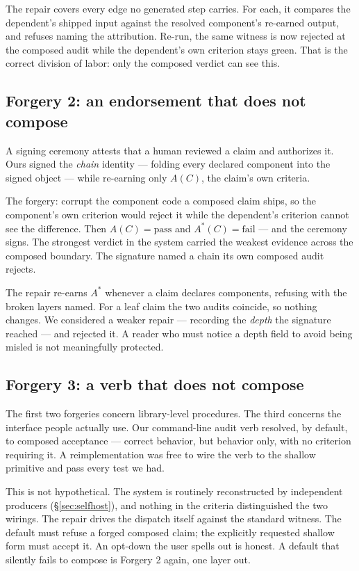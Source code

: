 \documentclass[10pt,twocolumn,letterpaper]{article}
\begin{document}
The repair covers every edge no generated step carries. For each, it compares the dependent's shipped input against the resolved component's re-earned output, and refuses naming the attribution. Re-run, the same witness is now rejected at the composed audit while the dependent's own criterion stays green. That is the correct division of labor: only the composed verdict can see this.

\subsection{Forgery 2: an endorsement that does not compose}
A signing ceremony attests that a human reviewed a claim and authorizes it. Ours signed the \emph{chain} identity --- folding every declared component into the signed object --- while re-earning only $A(C)$, the claim's own criteria.

The forgery: corrupt the component code a composed claim ships, so the component's own criterion would reject it while the dependent's criterion cannot see the difference. Then $A(C)=\mathrm{pass}$ and $A^\ast(C)=\mathrm{fail}$ --- and the ceremony signs. The strongest verdict in the system carried the weakest evidence across the composed boundary. The signature named a chain its own composed audit rejects.

The repair re-earns $A^\ast$ whenever a claim declares components, refusing with the broken layers named. For a leaf claim the two audits coincide, so nothing changes. We considered a weaker repair --- recording the \emph{depth} the signature reached --- and rejected it. A reader who must notice a depth field to avoid being misled is not meaningfully protected.

\subsection{Forgery 3: a verb that does not compose}
The first two forgeries concern library-level procedures. The third concerns the interface people actually use. Our command-line audit verb resolved, by default, to composed acceptance --- correct behavior, but behavior only, with no criterion requiring it. A reimplementation was free to wire the verb to the shallow primitive and pass every test we had.

This is not hypothetical. The system is routinely reconstructed by independent producers (§\ref{sec:selfhost}), and nothing in the criteria distinguished the two wirings. The repair drives the dispatch itself against the standard witness. The default must refuse a forged composed claim; the explicitly requested shallow form must accept it. An opt-down the user spells out is honest. A default that silently fails to compose is Forgery 2 again, one layer out.
\end{document}
